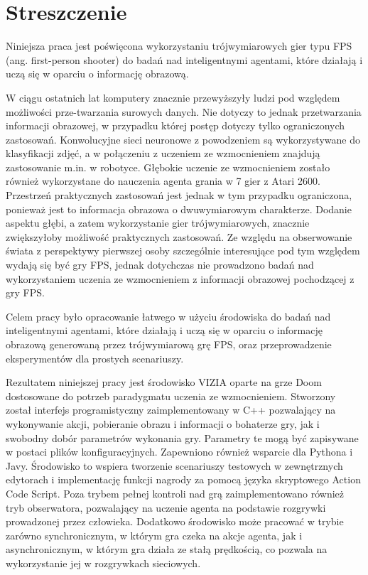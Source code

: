\chapter*{Streszczenie}

Niniejsza praca jest poświęcona wykorzystaniu trójwymiarowych gier typu FPS (ang. first-person shooter) do badań nad inteligentnymi agentami, które działają i uczą się w oparciu o informację obrazową.

W ciągu ostatnich lat komputery znacznie przewyższyły ludzi pod względem możliwości prze-twarzania surowych danych.
Nie dotyczy to jednak przetwarzania informacji obrazowej, w przypadku której postęp dotyczy tylko ograniczonych zastosowań.
Konwolucyjne sieci neuronowe z powodzeniem są wykorzystywane do klasyfikacji zdjęć, a w połączeniu z uczeniem ze wzmocnieniem znajdują zastosowanie m.in. w robotyce.
Głębokie uczenie ze wzmocnieniem zostało również wykorzystane do nauczenia agenta grania w 7 gier z Atari 2600.
Przestrzeń praktycznych zastosowań jest jednak w tym przypadku ograniczona, ponieważ jest to informacja obrazowa o dwuwymiarowym charakterze.
Dodanie aspektu głębi, a zatem wykorzystanie gier trójwymiarowych, znacznie zwiększyłoby możliwość praktycznych zastosowań.
Ze względu na obserwowanie świata z perspektywy pierwszej osoby szczególnie interesujące pod tym względem wydają się być gry FPS, jednak dotychczas nie prowadzono badań nad wykorzystaniem uczenia ze wzmocnieniem z informacji obrazowej pochodzącej z gry FPS.

Celem pracy było opracowanie łatwego w użyciu środowiska do badań nad inteligentnymi agentami, które działają i uczą się w oparciu o informację obrazową generowaną przez trójwymiarową grę FPS, oraz przeprowadzenie eksperymentów dla prostych scenariuszy.

Rezultatem niniejszej pracy jest środowisko VIZIA oparte na grze Doom dostosowane do potrzeb paradygmatu uczenia ze wzmocnieniem.
Stworzony został interfejs programistyczny zaimplementowany w C++ pozwalający na wykonywanie akcji, pobieranie obrazu i informacji o bohaterze gry, jak i swobodny dobór parametrów wykonania gry.
Parametry te mogą być zapisywane w postaci plików konfiguracyjnych.
Zapewniono również wsparcie dla Pythona i Javy.
Środowisko to wspiera tworzenie scenariuszy testowych w zewnętrznych edytorach i implementację funkcji nagrody za pomocą języka skryptowego Action Code Script.
Poza trybem pełnej kontroli nad grą zaimplementowano również tryb obserwatora, pozwalający na uczenie agenta na podstawie rozgrywki prowadzonej przez człowieka.
Dodatkowo środowisko może pracować w trybie zarówno synchronicznym, w którym gra czeka na akcje agenta, jak i asynchronicznym, w którym gra działa ze stałą prędkością, co pozwala na wykorzystanie jej w rozgrywkach sieciowych.

